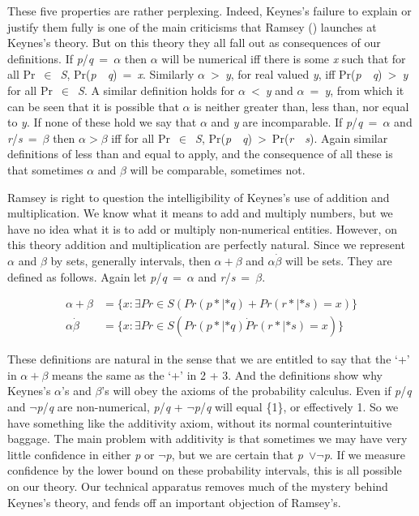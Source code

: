 \documentclass[
  10pt,
  letterpaper,
  DIV=11,
  numbers=noendperiod,
  twoside]{scrartcl}
\begin{document}
These five properties are rather perplexing. Indeed, Keynes's failure to
explain or justify them fully is one of the main criticisms that Ramsey
() launches at
Keynes's theory. But on this theory they all fall out as consequences of
our definitions. If \emph{p}/\emph{q}~=~\(\alpha\) then \(\alpha\) will
be numerical iff there is some \emph{x} such that for all
Pr~\(\in\)~\emph{S}, Pr(\emph{p}~\textbar~\emph{q})~=~\emph{x}.
Similarly \(\alpha\)~\textgreater~\emph{y}, for real valued \emph{y},
iff Pr(\emph{p}~\textbar~\emph{q})~\textgreater~\emph{y} for all
Pr~\(\in\)~\emph{S}. A similar definition holds for
\(\alpha\)~\textless~\emph{y} and \(\alpha\)~=~\emph{y}, from which it
can be seen that it is possible that \(\alpha\) is neither greater than,
less than, nor equal to \emph{y}. If none of these hold we say that
\(\alpha\) and \emph{y} are incomparable. If
\emph{p}/\emph{q}~=~\(\alpha\) and \emph{r}/\emph{s}~=~\(\beta\) then
\(\alpha > \beta\) iff for all Pr~\(\in\)~\emph{S},
Pr(\emph{p}~\textbar~\emph{q})~\textgreater~Pr(\emph{r}~\textbar~\emph{s}).
Again similar definitions of less than and equal to apply, and the
consequence of all these is that sometimes \(\alpha\) and \(\beta\) will
be comparable, sometimes not.

Ramsey is right to question the intelligibility of Keynes's use of
addition and multiplication. We know what it means to add and multiply
numbers, but we have no idea what it is to add or multiply non-numerical
entities. However, on this theory addition and multiplication are
perfectly natural. Since we represent \(\alpha\) and \(\beta\) by sets,
generally intervals, then \(\alpha + \beta\) and \(\alpha \dot \beta\)
will be sets. They are defined as follows. Again let
\emph{p}/\emph{q}~=~\(\alpha\) and \emph{r}/\emph{s}~=~\(\beta\).

\[
\begin{aligned}
\alpha + \beta &= \{x: \exists Pr \in S (Pr(p* | *q) + Pr(r* | *s) = x)\} \\
\alpha \dot \beta &= \{x: \exists Pr \in S (Pr(p* | *q) \dot Pr(r* | *s) = x)\} 
\end{aligned}
\]

These definitions are natural in the sense that we are entitled to say
that the `+' in \(\alpha + \beta\) means the same as the `+' in 2 + 3.
And the definitions show why Keynes's \(\alpha\)'s and \(\beta\)'s will
obey the axioms of the probability calculus. Even if \emph{p}/\emph{q}
and \(\neg\)\emph{p}/\emph{q} are non-numerical, \emph{p}/\emph{q} +
\(\neg\)\emph{p}/\emph{q} will equal \{1\}, or effectively 1. So we have
something like the additivity axiom, without its normal counterintuitive
baggage. The main problem with additivity is that sometimes we may have
very little confidence in either \emph{p} or \(\neg\)\emph{p}, but we
are certain that \emph{p}~\(\vee \neg\)\emph{p}. If we measure
confidence by the lower bound on these probability intervals, this is
all possible on our theory. Our technical apparatus removes much of the
mystery behind Keynes's theory, and fends off an important objection of
Ramsey's.
\end{document}
